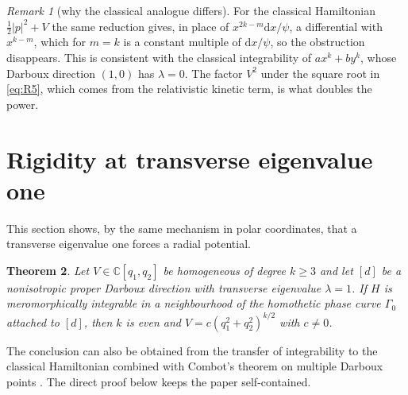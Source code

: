 \documentclass[11pt]{article}
\numberwithin{equation}{section}
\newtheorem{theorem}{Theorem}[section]
\theoremstyle{definition}
\theoremstyle{remark}
\newtheorem{remark}[theorem]{Remark}
\newcommand{\C}{\mathbb C}
\newcommand{\dd}{\mathrm d}
\begin{document}
\begin{remark}[why the classical analogue differs]\label{rem:classical}
For the classical Hamiltonian $\tfrac12|p|^2+V$ the same reduction gives, in place of $x^{2k-m}\dd x/\psi$, a
differential with $x^{k-m}$, which for $m=k$ is a constant multiple of $\dd x/\psi$, so the obstruction disappears.
This is consistent with the classical integrability of $ax^k+by^k$, whose Darboux direction $(1,0)$ has $\lambda=0$.
The factor $V^2$ under the square root in \eqref{eq:R5}, which comes from the relativistic kinetic term, is what doubles
the power.
\end{remark}

\section{Rigidity at transverse eigenvalue one}\label{sec:one}

This section shows, by the same mechanism in polar coordinates, that a transverse eigenvalue one forces a radial
potential.

\begin{theorem}\label{thm:one}
Let $V\in\C[q_1,q_2]$ be homogeneous of degree $k\ge3$ and let $[d]$ be a nonisotropic proper Darboux direction with
transverse eigenvalue $\lambda=1$. If $H$ is meromorphically integrable in a neighbourhood of the homothetic phase
curve $\Gamma_0$ attached to $[d]$, then $k$ is even and $V=c(q_1^2+q_2^2)^{k/2}$ with $c\ne0$.
\end{theorem}

The conclusion can also be obtained from the transfer of integrability to the classical Hamiltonian
\cite[Proposition~1]{PSM23} combined with Combot's theorem on multiple Darboux points \cite[Theorem~1]{Combot13}.
The direct proof below keeps the paper self-contained.
\end{document}
